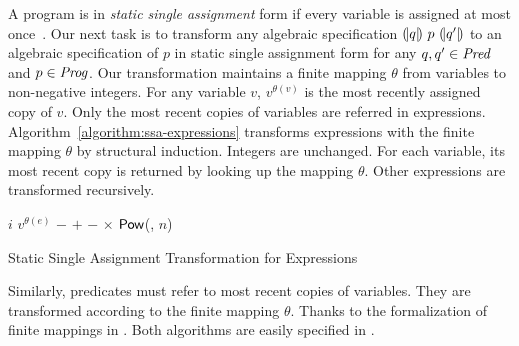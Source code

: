 
A program is in \emph{static single assignment} form if every variable
is assigned at most once~\cite{AWZ:88:DQVP}.
Our next task is to transform any algebraic specification
${(\!|}{q}{|\!)}~{p}~{(\!|}{q'}{|\!)}$ to an algebraic specification of $p$ in
static single  assignment form for any $q, q' \in \mathit{Pred}$ and $p \in
\mathit{Prog}$. Our transformation 
maintains a finite mapping $\theta$ from variables to
non-negative integers. For any variable $v$, $v^{\theta(v)}$ is
the most recently assigned copy of $v$. Only the most recent copies of
variables are referred in
expressions. Algorithm~\ref{algorithm:ssa-expressions} 
transforms expressions with the finite mapping $\theta$ by
structural induction. Integers are unchanged. For each variable, its
most recent copy is returned by looking up the mapping $\theta$. Other
expressions are transformed recursively. 

\begin{algorithm}
  \begin{algorithmic}[1]
       \Return $i$ \EndCase
       \Return $v^{\theta(e)}$ \EndCase
       \Return $-$ \EndCase
        \Return {} $+$ 
      \EndCase
        \Return {} $-$ 
      \EndCase
        \Return {} $\times$ 
      \EndCase
        \Return $\mbox{\textsf{Pow}}$(, $n$)
      \EndCase
    \EndMatch
    \EndFunction
  \end{algorithmic}
  \caption{Static Single Assignment Transformation for Expressions}
  \label{algorithm:ssa-expressions}
\end{algorithm}

Similarly, predicates must refer to most recent copies of 
variables. They are transformed according to the finite mapping
$\theta$. Thanks to the formalization of finite mappings in \coq. Both 
algorithms are easily specified in \gallina.


